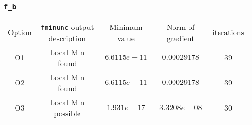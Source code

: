 \documentclass{article}
\begin{document}
    \subsubsection{\texttt{f\_b}}
    \begin{center}
    \begin{tabular}{c|c|c|c|c}
    \hline
    Option&\texttt{fminunc} output description&Minimum value&Norm of gradient&iterations\\
    O1&Local Min found&$6.6115e-11$&$0.00029178$&39\\
    O2&Local Min found&$6.6115e-11$&$0.00029178$&39\\
    O3&Local Min possible&$1.931e-17$&$3.3208e-08$&30\\
    \hline
    \end{tabular}
    \end{center}
\end{document}
